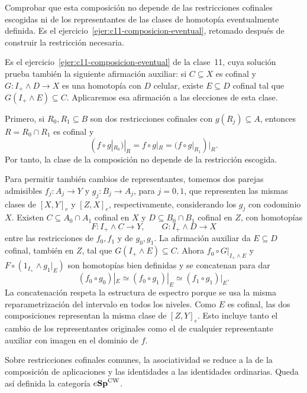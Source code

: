 \begin{ejer}\label{ejer:c12-composicion-eventual}
Comprobar que esta composición no depende de las restricciones cofinales escogidas ni de los representantes de las clases de homotopía eventualmente definida. Es el ejercicio~\ref{ejer:c11-composicion-eventual}, retomado después de construir la restricción necesaria.
\end{ejer}
\begin{sol}
Es el ejercicio~\ref{ejer:c11-composicion-eventual} de la clase~11, cuya solución prueba también la siguiente afirmación auxiliar: si $C\subseteq X$ es cofinal y $G\colon I_+\wedge D\to X$ es una homotopía con $D$ celular, existe $E\subseteq D$ cofinal tal que $G(I_+\wedge E)\subseteq C$. Aplicaremos esa afirmación a las elecciones de esta clase.

Primero, si $R_0,R_1\subseteq B$ son dos restricciones cofinales con $g(R_j)\subseteq A$, entonces $R=R_0\cap R_1$ es cofinal y
\[
(f\circ g|_{R_0})|_R=f\circ g|_R=(f\circ g|_{R_1})|_R.
\]
Por tanto, la clase de la composición no depende de la restricción escogida.

Para permitir también cambios de representantes, tomemos dos parejas admisibles $f_j\colon A_j\to Y$ y $g_j\colon B_j\to A_j$, para $j=0,1$, que representen las mismas clases de $[X,Y]_e$ y $[Z,X]_e$, respectivamente, considerando los $g_j$ con codominio $X$. Existen $C\subseteq A_0\cap A_1$ cofinal en $X$ y $D\subseteq B_0\cap B_1$ cofinal en $Z$, con homotopías
\[
F\colon I_+\wedge C\to Y,\qquad G\colon I_+\wedge D\to X
\]
entre las restricciones de $f_0,f_1$ y de $g_0,g_1$. La afirmación auxiliar da $E\subseteq D$ cofinal, también en $Z$, tal que $G(I_+\wedge E)\subseteq C$. Ahora $f_0\circ G|_{I_+\wedge E}$ y $F\circ(1_{I_+}\wedge g_1|_E)$ son homotopías bien definidas y se concatenan para dar
\[
(f_0\circ g_0)|_E\simeq(f_0\circ g_1)|_E\simeq(f_1\circ g_1)|_E.
\]
La concatenación respeta la estructura de espectro porque se usa la misma reparametrización del intervalo en todos los niveles. Como $E$ es cofinal, las dos composiciones representan la misma clase de $[Z,Y]_e$. Esto incluye tanto el cambio de los representantes originales como el de cualquier representante auxiliar con imagen en el dominio de $f$.
\end{sol}

Sobre restricciones cofinales comunes, la asociatividad se reduce a la de la composición de aplicaciones y las identidades a las identidades ordinarias. Queda así definida la categoría $e\mathbf{Sp}^{\mathrm{CW}}$.

